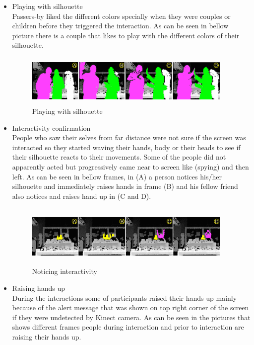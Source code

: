 \begin{enumerate}
\begin{itemize}
\item Playing with silhouette  \\
Passers-by liked the different colors specially when they were couples or children before they triggered the interaction. As can be seen in bellow picture there is a couple that likes to play with the different colors of their silhouette.

\begin{figure}[H]
    \centering
    \includegraphics[width=100mm,height=25mm]{Figures/8/body_inter_findings/effects/playing}
    \caption{Playing with silhouette}
    \label{fig:playing_interaction}
\end{figure}


\item Interactivity confirmation \\
People who saw their selves from far distance were not sure if the screen was interacted so they started waving their hands, body or their heads to see if their silhouette reacts to their movements. Some of the people did not apparently acted but progressively came near to screen like (spying) and then left. As can be seen in bellow frames, in (A) a person notices his/her silhouette and immediately raises hands in frame (B) and his fellow friend also notices and raises hand up in (C and D).

\begin{figure}[H]
    \centering
    \includegraphics[width=100mm,height=30mm]{Figures/8/body_inter_findings/effects/noticing}
    \caption{Noticing interactivity}
    \label{fig:noticing_interactivity}
\end{figure}
 

\item Raising hands up \\
During the interactions some of participants raised their hands up mainly because of the alert message that was shown on top right corner of the screen if they were undetected by Kinect camera. As can be seen in the pictures that shows different frames people during interaction and prior to interaction are raising their hands up. 


\end{itemize}
\end{enumerate}
